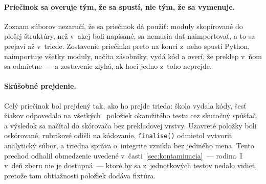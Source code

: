 \paragraph{Priečinok sa overuje tým, že sa spustí, nie tým, že sa vymenuje.}
Zoznam súborov nezaručí, že sa priečinok dá použiť: moduly skopírované do plošej
štruktúry, než v~akej boli napísané, sa nemusia dať naimportovať, a to sa prejaví
až v~triede. Zostavenie priečinka preto na konci z~neho spustí Python, naimportuje
všetky moduly, načíta zásobníky, vydá kód a overí, že preklep v~ňom sa odmietne~---
a zostavenie zlyhá, ak hoci jedno z~toho neprejde.

\paragraph{Skúšobné prejdenie.} Celý priečinok bol prejdený tak, ako ho prejde
trieda: škola vydala kódy, šesť žiakov odpovedalo na všetkých
\asmFormItems{}~položiek okamžitého testu cez skutočný spúšťač, a výsledok sa
načítal do skórovača bez prekladovej vrstvy. Uzavreté položky boli oskórované,
rubrikové odišli na kódovanie, \texttt{finalise()} odmietol vytvoriť analytický
súbor, a triedna správa o~integrite vznikla bez jediného mena. Tento prechod
odhalil obmedzenie uvedené v~časti~\ref{sec:kontaminacia}~--- rodina~I v~deň zberu
nie je dostupná~--- ktoré by sa z~jednotkových testov nedalo vidieť, pretože tam
obtiažnosti položiek dodáva fixtúra.

